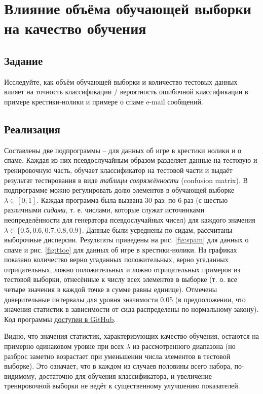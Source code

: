 \documentclass[a4paper,12pt]{article} %
\begin{document}


\section{Влияние объёма обучающей выборки на качество обучения}
\subsection{Задание}
Исследуйте, как объём обучающей выборки и количество тестовых данных влияет на точность классификации / вероятность ошибочной классификации в примере крестики-нолики и примере о спаме e-mail сообщений.

\subsection{Реализация}
Составлены две подпрограммы -- для данных об игре в крестики нолики и о спаме.
Каждая из них псевдослучайным образом разделяет данные на тестовую и тренировочную часть, обучает классификатор на тестовой части и выдаёт результат тестирования в виде \textit{таблицы сопряжённости} (confusion matrix). 
В подпрограмме можно регулировать долю элементов в обучающей выборке $\lambda \in [0;1]$. Каждая программа была вызвана 30 раз: по 6 раз (с шестью различными \textit{сидами}, т. е. числами, которые служат источниками неопределённости для генератора псевдослучайных чисел) для каждого значения $\lambda \in \{0.5, 0.6, 0.7, 0.8, 0.9\}$. 
Данные были усреднены по сидам, рассчитаны выборочные дисперсии. Результаты приведены на рис. \ref{fig:spam} для данных о спаме и рис. \ref{fig:ttoe} для данных об игре в крестики-нолики. На графиках показано количество верно угаданных положительных, верно угаданных отрицательных, ложно положительных и ложно отрицательных примеров из тестовой выборки, отнесённые к числу всех элементов в выборке (т. о. все четыре значения в каждой точке в сумме равны единице). Отмечены доверительные интервалы для уровня значимости 0.05 (в предположении, что значения статистик в зависимости от сида распределены по нормальному закону). Код программы \href{https://github.com/zuevval/source/blob/master/r/ml/lab1bayes/task1_spam_tictactoe.R}{доступен в GitHub}.

Видно, что значения статистик, характеризующих качество обучения, остаются на примерно одинаковом уровне при всех $\lambda$ из рассмотренного диапазона (но разброс заметно возрастает при уменьшении числа элементов в тестовой выборке).
Это означает, что в каждом из случаев половины всего набора, по-видимому, достаточно для обучения классификатора, и увеличение тренировочной выборки не ведёт к существенному улучшению показателей.
\end{document}
